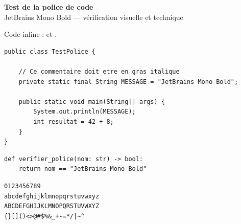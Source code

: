 \documentclass[10pt,a4paper]{article}
\begin{document}
\pagestyle{empty}

\begin{center}
  {\sffamily\bfseries\Large Test de la police de code}\\[0.25cm]
  {\small JetBrains Mono Bold — vérification visuelle et technique}
\end{center}

\vspace{0.5cm}

\noindent
Code inline :  et
.

\begin{lstlisting}[style=java,caption={Test Java — JetBrains Mono Bold}]
public class TestPolice {

    // Ce commentaire doit etre en gras italique
    private static final String MESSAGE = "JetBrains Mono Bold";

    public static void main(String[] args) {
        System.out.println(MESSAGE);
        int resultat = 42 + 8;
    }
}
\end{lstlisting}

\begin{lstlisting}[style=python,caption={Test Python — JetBrains Mono Bold}]
def verifier_police(nom: str) -> bool:
    return nom == "JetBrains Mono Bold"
\end{lstlisting}

\begin{lstlisting}[style=text,caption={Test des caractères}]
0123456789
abcdefghijklmnopqrstuvwxyz
ABCDEFGHIJKLMNOPQRSTUVWXYZ
{}[]()<>@#$%&_+-=*/|~^
\end{lstlisting}
\end{document}
